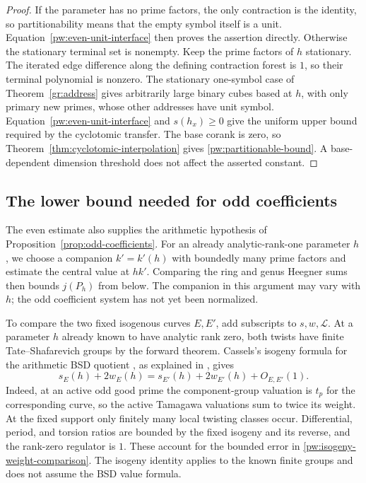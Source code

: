 \begin{proof}
If the parameter has no prime factors, the only contraction is the identity,
so partitionability means that the empty symbol itself is a unit.
Equation~\eqref{pw:even-unit-interface}
then proves the assertion directly.  Otherwise the stationary terminal
set is nonempty.
Keep the prime factors of $h$ stationary.  The iterated edge difference
along the defining contraction forest is $1$, so their terminal polynomial
is nonzero.  The stationary one-symbol case
of Theorem~\ref{gr:address} gives arbitrarily large binary cubes based at
$h$, with only primary new primes, whose other addresses have unit symbol.
Equation~\eqref{pw:even-unit-interface} and $s(h_x)\ge0$ give the uniform
upper bound required by the cyclotomic transfer.  The base corank is zero,
so Theorem~\ref{thm:cyclotomic-interpolation} gives \eqref{pw:partitionable-bound}.  A base-dependent
dimension threshold does not affect the asserted constant.
\end{proof}

\subsection{The lower bound needed for odd coefficients}

The even estimate also supplies the arithmetic hypothesis of
Proposition~\ref{prop:odd-coefficients}. For an already analytic-rank-one
parameter $h$, we choose a companion $k'=k'(h)$ with boundedly many prime
factors and estimate the central value at $hk'$. Comparing the ring and
genus Heegner sums then bounds $j(P_h)$ from below. The companion in this
argument may vary with $h$; the odd coefficient system has not yet been
normalized.

To compare the two fixed isogenous curves $E,E'$, add subscripts to
$s,w,\mathcal L$. At a parameter $h$ already known to have analytic rank
zero, both twists have finite Tate--Shafarevich groups by the forward
theorem. Cassels's isogeny formula for the arithmetic BSD quotient
\citep{Cassels1965}, as explained in
\citet[Theorem~2.1 and the following discussion]{Tate1966}, gives
\begin{equation}\label{pw:isogeny-weight-comparison}
 s_E(h)+2w_E(h)=s_{E'}(h)+2w_{E'}(h)+O_{E,E'}(1).
\end{equation}
Indeed, at an active odd good prime the component-group valuation is
$t_p$ for the corresponding curve, so the active Tamagawa valuations
sum to twice its weight. At the fixed support only finitely many local
twisting classes occur. Differential, period, and torsion ratios are
bounded by the fixed isogeny and its reverse, and the rank-zero regulator
is $1$. These account for the bounded error in
\eqref{pw:isogeny-weight-comparison}. The isogeny identity applies to the
known finite groups and does not assume the BSD value formula.

